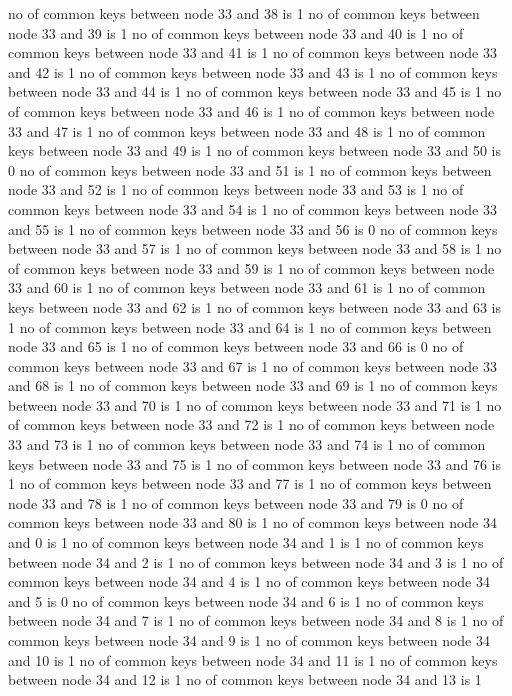 no of common keys between node 33 and 38 is 1
no of common keys between node 33 and 39 is 1
no of common keys between node 33 and 40 is 1
no of common keys between node 33 and 41 is 1
no of common keys between node 33 and 42 is 1
no of common keys between node 33 and 43 is 1
no of common keys between node 33 and 44 is 1
no of common keys between node 33 and 45 is 1
no of common keys between node 33 and 46 is 1
no of common keys between node 33 and 47 is 1
no of common keys between node 33 and 48 is 1
no of common keys between node 33 and 49 is 1
no of common keys between node 33 and 50 is 0
no of common keys between node 33 and 51 is 1
no of common keys between node 33 and 52 is 1
no of common keys between node 33 and 53 is 1
no of common keys between node 33 and 54 is 1
no of common keys between node 33 and 55 is 1
no of common keys between node 33 and 56 is 0
no of common keys between node 33 and 57 is 1
no of common keys between node 33 and 58 is 1
no of common keys between node 33 and 59 is 1
no of common keys between node 33 and 60 is 1
no of common keys between node 33 and 61 is 1
no of common keys between node 33 and 62 is 1
no of common keys between node 33 and 63 is 1
no of common keys between node 33 and 64 is 1
no of common keys between node 33 and 65 is 1
no of common keys between node 33 and 66 is 0
no of common keys between node 33 and 67 is 1
no of common keys between node 33 and 68 is 1
no of common keys between node 33 and 69 is 1
no of common keys between node 33 and 70 is 1
no of common keys between node 33 and 71 is 1
no of common keys between node 33 and 72 is 1
no of common keys between node 33 and 73 is 1
no of common keys between node 33 and 74 is 1
no of common keys between node 33 and 75 is 1
no of common keys between node 33 and 76 is 1
no of common keys between node 33 and 77 is 1
no of common keys between node 33 and 78 is 1
no of common keys between node 33 and 79 is 0
no of common keys between node 33 and 80 is 1
no of common keys between node 34 and 0 is 1
no of common keys between node 34 and 1 is 1
no of common keys between node 34 and 2 is 1
no of common keys between node 34 and 3 is 1
no of common keys between node 34 and 4 is 1
no of common keys between node 34 and 5 is 0
no of common keys between node 34 and 6 is 1
no of common keys between node 34 and 7 is 1
no of common keys between node 34 and 8 is 1
no of common keys between node 34 and 9 is 1
no of common keys between node 34 and 10 is 1
no of common keys between node 34 and 11 is 1
no of common keys between node 34 and 12 is 1
no of common keys between node 34 and 13 is 1
